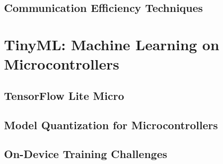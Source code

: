\subsection{Communication Efficiency Techniques}

\section{TinyML: Machine Learning on Microcontrollers}
\label{sec:tinyml-theory}

\subsection{TensorFlow Lite Micro}

\subsection{Model Quantization for Microcontrollers}

\subsection{On-Device Training Challenges}
